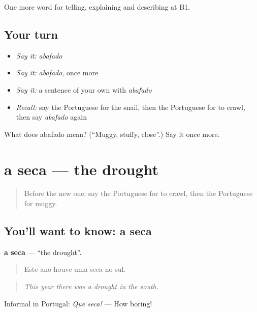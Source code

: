 \begin{grammarlens}[title={What you've built}]
One more word for telling, explaining and describing at B1.
\end{grammarlens}

\subsection*{Your turn}
\begin{itemize}
\raggedright
  \item \emph{Say it:} \emph{abafado}
  \item \emph{Say it:} \emph{abafado}, once more
  \item \emph{Say it:} a sentence of your own with \emph{abafado}
  \item \emph{Recall:} say the Portuguese for the snail, then the Portuguese for to crawl, then say \emph{abafado} again
\end{itemize}

\begin{tcolorbox}[breakable,colback=teal!4,colframe=teal!35!black,title={Before you move on}]
What does abafado mean? (\textquotedblleft{}Muggy, stuffy, close\textquotedblright{}.) Say it once more.
\end{tcolorbox}
\section[a seca]{a seca — the drought}

\label{lesson:PT-C462-seca}



\begin{quote}
Before the new one: say the Portuguese for to crawl, then the Portuguese for muggy.
\end{quote}

\subsection*{You'll want to know: a seca}
\textbf{a seca} — \textquotedblleft{}the drought\textquotedblright{}.

\begin{quote}
Este ano houve uma seca no sul.
\end{quote}

\begin{quote}
\emph{This year there was a drought in the south.}
\end{quote}

Informal in Portugal: \emph{Que seca!} — How boring!

